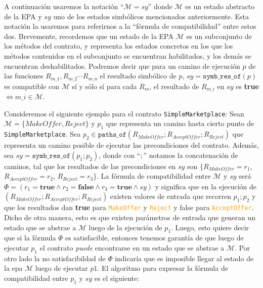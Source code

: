 A continuación usaremos la notación ``$\mathcal{M}=sy$'' donde $\mathcal{M}$ es un estado abstracto de la EPA y $sy$ uno de los estados simbólicos mencionados anteriormente.
Esta notación la usaremos para referirnos a la ``fórmula de compatibilidad'' entre estos dos.
Brevemente, recordemos que un estado de la EPA $\mathcal{M}$ es un subconjunto de los métodos del contrato, y representa los estados concretos en los que los métodos contenidos en el subconjunto se encuentran habilitados, y los demás se encuentran deshabilitados.
Podremos decir que para un camino de ejecución $p$ de las funciones $R_{m\_1},R_{m\_2} \cdots R_{m\_n}$ el resultado simbólico de $p$, $sy = \texttt{symb\_res\_of}(p)$ es compatible con $\mathcal{M}$ sí y sólo sí para cada $R_m$, el resultado de $R_{m\_i}$ en $sy$ es \textbf{true} $\iff m\_i \in \mathcal{M}$.

Consideremos el siguiente ejemplo para el contrato \texttt{Simple\allowbreak Marketplace}:
Sean $\mathcal{M} = \{MakeOffer, Reject\}$ y $p_1$ que representa un camino hasta cierto punto de \texttt{SimpleMarketplace}.
Sea $p_2 \in \texttt{paths\_of}(R_{MakeOffer}; R_{AcceptOffer}; R_{Reject})$ que representa un camino posible de ejecutar las precondiciones del contrato.
Además, sea $sy = \texttt{symb\_res\_of}(p_1;p_2)$, donde con ``$;$'' notamos la concatenación de caminos, tal que los resultados de las precondiciones en $sy$ son $\{R_{MakeOffer} = r_1$, $R_{AcceptOffer} = r_2$, $R_{Reject} = r_3\}$.
La fórmula de compatibilidad entre $\mathcal{M}$ y $sy$ será $\Phi = (r_1 = \textbf{true} \land r_2 = \textbf{false} \land r_3 = \textbf{true} \land sy)$ y significa que en la ejecución de $(R_{MakeOffer}; R_{AcceptOffer}; R_{Reject})$ existen valores de entrada que recorren $p_1;p_2$ y que los resultados dan \textbf{true} para \textcolor{orange}{\texttt{MakeOffer}} y \textcolor{orange}{\texttt{Reject}} y false para \textcolor{orange}{\texttt{AcceptOffer}}.
Dicho de otra manera, esto es que existen parámetros de entrada que generan un estado que se abstrae a $\mathcal{M}$ luego de la ejecución de $p_1$.
Luego, esto quiere decir que si la fórmula $\Phi$ es satisfacible, entonces tenemos garantía de que luego de ejecutar $p_1$ el contrato \textit{puede} encontrarse en un estado que se abstrae a $\mathcal{M}$.
Por otro lado la no satisfacibildad de $\Phi$ indicaría que es imposible llegar al estado de la epa $\mathcal{M}$ luego de ejecutar $p1$.
El algoritmo para expresar la fórmula de compatibilidad entre $p_1$ y $sy$ es el siguiente:


